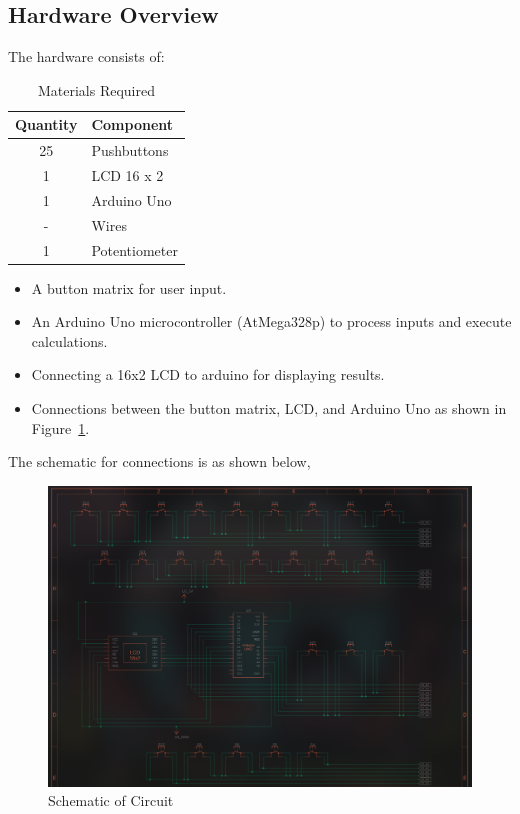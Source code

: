 \documentclass[a4paper,12pt]{article}
\begin{document}
\subsection*{Hardware Overview}


The hardware consists of:
\begin{table}[H]
\centering
\begin{tabular}{|c|l|}
\hline
\textbf{Quantity} & \textbf{Component} \\
\hline
25 & Pushbuttons \\
\hline
1 & LCD 16 x 2 \\
\hline
1 & Arduino Uno\\
\hline
- & Wires \\
\hline
1 & Potentiometer \\
\hline
\end{tabular}
\caption{Materials Required}
\label{tab:materials}
\end{table}

\begin{itemize}
    \item A button matrix for user input.
    \item An Arduino Uno microcontroller (AtMega328p) to process inputs and execute calculations.
    \item Connecting a 16x2 LCD to arduino for displaying results.
    \item Connections between the button matrix, LCD, and Arduino Uno as shown in Figure~\ref{fig:circuit_schematic}.
\end{itemize}
The schematic for connections is as shown below,
\begin{figure}[H]
    \centering
    \includegraphics[width=\textwidth]{figs/circuit_schematic.png}
    \caption{Schematic of Circuit}
    \label{fig:circuit_schematic}
\end{figure}
\end{document}
